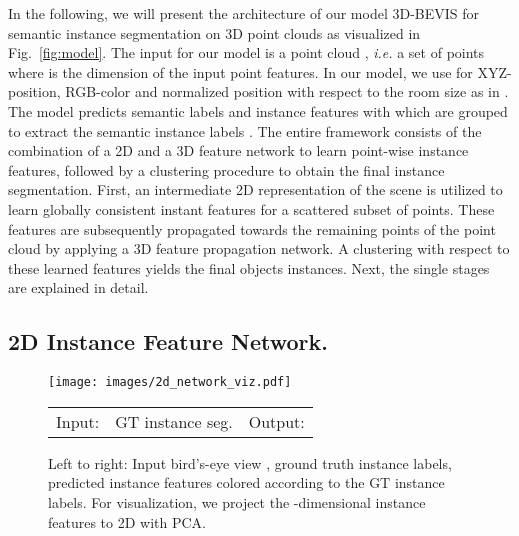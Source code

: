 \documentclass[runningheads]{llncs}
\newcommand{\reffig}[1]{Fig.~\ref{fig:#1}}
\newcommand{\ie}{\textit{i.e. }}
\begin{document}
In  the following, we will present the architecture of our model 3D-BEVIS for semantic instance segmentation on 3D point clouds as visualized in \reffig{model}.
The input for our model is a point cloud , \ie a set of points  where  is the dimension of the input point features. In our model, we use  for XYZ-position, RGB-color and normalized position with respect to the room size as in \cite{Qi17CVPR}.
The model predicts semantic labels  and instance features  with 
which are grouped to extract the semantic instance labels
.
The entire framework consists of the combination of a 2D and a 3D feature network to learn point-wise instance features, followed by a clustering procedure to obtain the final instance segmentation.
First, an intermediate 2D representation of the scene is utilized to learn globally consistent instant features for a scattered subset of points. These features are subsequently propagated towards the remaining points of the point cloud by applying a 3D feature propagation network. A clustering with respect to these learned features yields the final objects instances.
Next, the single stages are explained in detail.

\subsection{2D Instance Feature Network.}
\begin{figure}[t]
	\begin{center}
	\texttt{[image: images/2d\_network\_viz.pdf]}
	\end{center}
	\vspace{-4mm}
	\begin{small}
	\begin{tabular}{ccc}
		\hspace{30mm} Input:  &
		\hspace{4mm} GT instance seg.  &
		\hspace{4mm} Output:  \\
	\end{tabular}
	\end{small}
	\vspace{1mm}
	\caption{Left to right: Input bird's-eye view , ground truth instance labels, predicted instance features  colored according to the GT instance labels. For visualization, we project the -dimensional instance features  to 2D with PCA.}
	\label{fig:2d_network_viz}
\end{figure}
\end{document}
